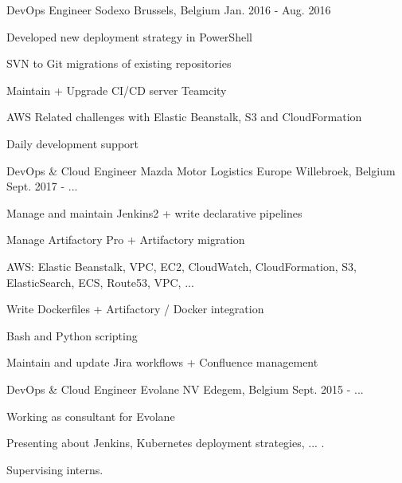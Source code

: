 \begin{cventries}
  \cventry
    {DevOps Engineer} %
    {Sodexo} %
    {Brussels, Belgium} %
    {Jan. 2016 - Aug. 2016} %
    {
      \begin{cvitems} %
        \item {Developed new deployment strategy in PowerShell}
        \item {SVN to Git migrations of existing repositories}
        \item {Maintain + Upgrade CI/CD server Teamcity}
        \item {AWS Related challenges with Elastic Beanstalk, S3 and CloudFormation}
        \item {Daily development support}
      \end{cvitems}
    }

  \cventry
    {DevOps \& Cloud Engineer} %
    {Mazda Motor Logistics Europe} %
    {Willebroek, Belgium} %
    {Sept. 2017 - ...} %
    {
      \begin{cvitems} %
        \item {Manage and maintain Jenkins2 + write declarative pipelines}
        \item {Manage Artifactory Pro + Artifactory migration}
        \item {AWS: Elastic Beanstalk, VPC, EC2, CloudWatch, CloudFormation, S3, ElasticSearch, ECS, Route53, VPC, ...}
        \item {Write Dockerfiles + Artifactory / Docker integration}
        \item {Bash and Python scripting}
        \item {Maintain and update Jira workflows + Confluence management}
      \end{cvitems}
    }

  \cventry
    {DevOps \& Cloud Engineer} %
    {Evolane NV} %
    {Edegem, Belgium} %
    {Sept. 2015 - ...} %
    {
      \begin{cvitems} %
        \item {Working as consultant for Evolane}
        \item {Presenting about Jenkins, Kubernetes deployment strategies, ... .}
        \item {Supervising interns.}
      \end{cvitems}
    }

\end{cventries}
